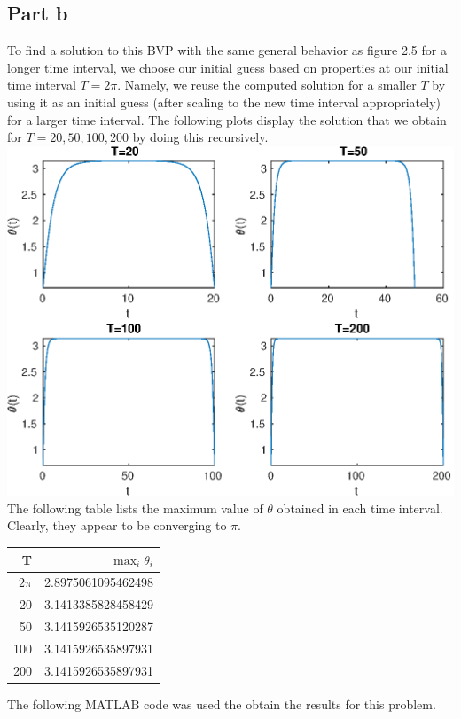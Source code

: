 \documentclass{article}
\begin{document}
	\subsection{Part b}
To find a solution to this BVP with the same general behavior as figure 2.5 for a longer time interval, we choose our initial guess based on properties at our initial time interval $T=2\pi$. Namely, we reuse the computed solution for a smaller $T$ by using it as an initial guess (after scaling to the new time interval appropriately) for a larger time interval. The following plots display the solution that we obtain for $T=20,50,100,200$ by doing this recursively. \\
\includegraphics{hw3p1b.eps}\\
The following table lists the maximum value of $\theta$ obtained in each time interval. Clearly, they appear to be converging to $\pi$.
\begin{table}[H]\centering
\begin{tabular}{|r|r|}\hline
{T}&{$\max_i\theta_i$}\\\hline
$2\pi$&2.8975061095462498\\
20&      3.1413385828458429\\
50&      3.1415926535120287\\
100&      3.1415926535897931\\
200&     3.1415926535897931\\\hline
\end{tabular}
\end{table}
The following MATLAB code was used the obtain the results for this problem. 
\end{document}

